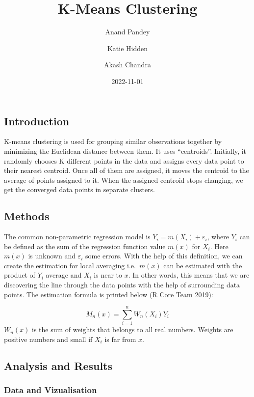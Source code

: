 \documentclass[
]{article}
\title{K-Means Clustering}
\author{Anand Pandey \and Katie Hidden \and Akash Chandra}
\date{2022-11-01}
\begin{document}
\maketitle

\hypertarget{introduction}{%
\subsection{Introduction}\label{introduction}}

K-means clustering is used for grouping similar observations together by
minimizing the Euclidean distance between them. It uses ``centroids''.
Initially, it randomly chooses K different points in the data and
assigns every data point to their nearest centroid. Once all of them are
assigned, it moves the centroid to the average of points assigned to it.
When the assigned centroid stops changing, we get the converged data
points in separate clusters.

\hypertarget{methods}{%
\subsection{Methods}\label{methods}}

The common non-parametric regression model is
\(Y_i = m(X_i) + \varepsilon_i\), where \(Y_i\) can be defined as the
sum of the regression function value \(m(x)\) for \(X_i\). Here \(m(x)\)
is unknown and \(\varepsilon_i\) some errors. With the help of this
definition, we can create the estimation for local averaging
i.e.~\(m(x)\) can be estimated with the product of \(Y_i\) average and
\(X_i\) is near to \(x\). In other words, this means that we are
discovering the line through the data points with the help of
surrounding data points. The estimation formula is printed below (R Core
Team 2019):

\[
M_n(x) = \sum_{i=1}^{n} W_n (X_i) Y_i  \tag{1}
\] \(W_n(x)\) is the sum of weights that belongs to all real numbers.
Weights are positive numbers and small if \(X_i\) is far from \(x\).

\hypertarget{analysis-and-results}{%
\subsection{Analysis and Results}\label{analysis-and-results}}

\hypertarget{data-and-vizualisation}{%
\subsubsection{Data and Vizualisation}\label{data-and-vizualisation}}
\end{document}
